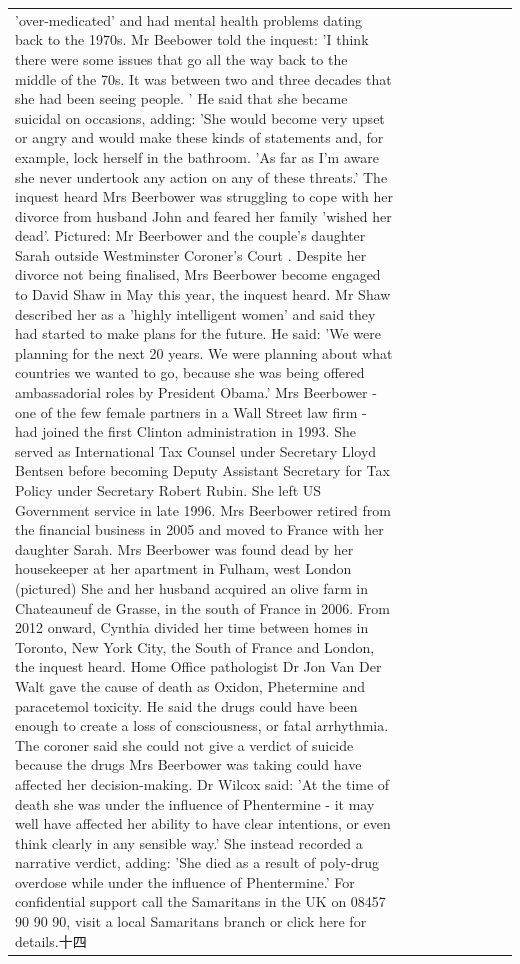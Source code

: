 \begin{table}[H]
\begin{tabular}{lllrlllll}
'over-medicated' and had mental health problems dating back to the 1970s. Mr Beebower told the inquest: 'I think there were some issues that go all the way back to the middle of the 70s. It was between two and three decades that she had been seeing people. ' He said that she became suicidal on occasions, adding: 'She would become very upset or angry and would make these kinds of statements and, for example, lock herself in the bathroom. 'As far as I'm aware she never undertook any action on any of these threats.' The inquest heard Mrs Beerbower was struggling to cope with her divorce from husband John and feared her family 'wished her dead'. Pictured: Mr Beerbower and the couple's daughter Sarah outside Westminster Coroner's Court . Despite her divorce not being finalised, Mrs Beerbower become engaged to David Shaw in May this year, the inquest heard. Mr Shaw described her as a 'highly intelligent women' and said they had started to make plans for the future. He said: 'We were planning for the next 20 years. We were planning about what countries we wanted to go, because she was being offered ambassadorial roles by President Obama.' Mrs Beerbower - one of the few female partners in a Wall Street law firm - had joined the first Clinton administration in 1993. She served as International Tax Counsel under Secretary Lloyd Bentsen before becoming Deputy Assistant Secretary for Tax Policy under Secretary Robert Rubin. She left US Government service in late 1996. Mrs Beerbower retired from the financial business in 2005 and moved to France with her daughter Sarah. Mrs Beerbower was found dead by her housekeeper at her apartment in Fulham, west London (pictured) She and her husband acquired an olive farm in Chateauneuf de Grasse, in the south of France in 2006. From 2012 onward, Cynthia divided her time between homes in Toronto, New York City, the South of France and London, the inquest heard. Home Office pathologist Dr Jon Van Der Walt gave the cause of death as Oxidon, Phetermine and paracetemol toxicity. He said the drugs could have been enough to create a loss of consciousness, or fatal arrhythmia. The coroner said she could not give a verdict of suicide because the drugs Mrs Beerbower was taking could have affected her decision-making. Dr Wilcox said: 'At the time of death she was under the influence of Phentermine - it may well have affected her ability to have clear intentions, or even think clearly in any sensible way.' She instead recorded a narrative verdict, adding: 'She died as a result of poly-drug overdose while under the influence of Phentermine.' For confidential support call the Samaritans in the UK on 08457 90 90 90, visit a local Samaritans branch or click here for details.十四 \\

\end{tabular}
\end{table}
